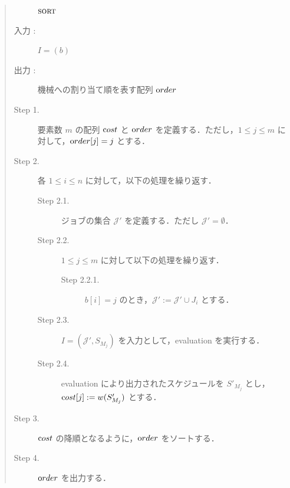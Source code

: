 \documentclass[12pt]{optlab-bachelor}
\begin{document}
\begin{quote}
  \begin{description}
    \item[] ${\mbox {\bf {\sc sort}}}$
    \item[入力 :] $I = (b)$
    \item[出力 :] 機械への割り当て順を表す配列 ${\mbox order}$
  \end{description}
  \begin{description}
    \item[Step 1.] 要素数 $m$ の配列 ${\mbox cost}$ と ${\mbox order}$ を定義する．ただし，$1 \le j \le m $ に対して，${\mbox order}[j] = j$ とする．
    \item[Step 2.] 各 $1 \le i \le n$ に対して，以下の処理を繰り返す．
    \begin{description}
      \item[Step 2.1.] ジョブの集合 $\mathcal{J}'$ を定義する．ただし $\mathcal{J}' = \emptyset$．
      \item[Step 2.2.] $1 \le j \le m$ に対して以下の処理を繰り返す．
      \begin{description}
        \item[Step 2.2.1.] $b[i] = j$ のとき，$\mathcal{J}' :=\mathcal{J}' \cup J_i$ とする．
      \end{description}
      \item[Step 2.3.] $I = (\mathcal{J}',S_{M_j})$ を入力として，{\sc evaluation} を実行する．
      \item[Step 2.4.] {\sc evaluation} により出力されたスケジュールを $S'_{M_j}$ とし，\\${\mbox cost}[j] := w(S'_{M_j})$ とする．
    \end{description}
    \item[Step 3.] ${\mbox cost}$ の降順となるように，${\mbox order}$ をソートする．
    \item[Step 4.] ${\mbox order}$ を出力する．
  \end{description}
\end{quote}

\end{document}

